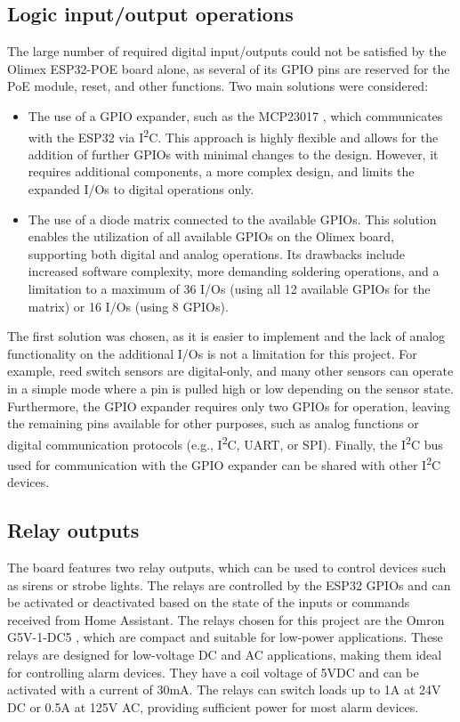 \documentclass[a4paper,12pt]{article}
\begin{document}
\subsection{Logic input/output operations}
The large number of required digital input/outputs could not be satisfied by the Olimex ESP32-POE board alone, as several of its GPIO pins are reserved for the PoE module, reset, and other functions. Two main solutions were considered:
\begin{itemize}
    \item The use of a GPIO expander, such as the MCP23017 \cite{MCP23017}, which communicates with the ESP32 via I\textsuperscript{2}C. This approach is highly flexible and allows for the addition of further GPIOs with minimal changes to the design. However, it requires additional components, a more complex design, and limits the expanded I/Os to digital operations only.
    \item The use of a diode matrix connected to the available GPIOs. This solution enables the utilization of all available GPIOs on the Olimex board, supporting both digital and analog operations. Its drawbacks include increased software complexity, more demanding soldering operations, and a limitation to a maximum of 36 I/Os (using all 12 available GPIOs for the matrix) or 16 I/Os (using 8 GPIOs).
\end{itemize}

The first solution was chosen, as it is easier to implement and the lack of analog functionality on the additional I/Os is not a limitation for this project. For example, reed switch sensors are digital-only, and many other sensors can operate in a simple mode where a pin is pulled high or low depending on the sensor state. Furthermore, the GPIO expander requires only two GPIOs for operation, leaving the remaining pins available for other purposes, such as analog functions or digital communication protocols (e.g., I\textsuperscript{2}C, UART, or SPI). Finally, the I\textsuperscript{2}C bus used for communication with the GPIO expander can be shared with other I\textsuperscript{2}C devices.

\subsection{Relay outputs}
The board features two relay outputs, which can be used to control devices such as sirens or strobe lights. The relays are controlled by the ESP32 GPIOs and can be activated or deactivated based on the state of the inputs or commands received from Home Assistant. The relays chosen for this project are the Omron G5V-1-DC5 \cite{G5V1DC5}, which are compact and suitable for low-power applications.
These relays are designed for low-voltage DC and AC applications, making them ideal for controlling alarm devices. They have a coil voltage of 5VDC and can be activated with a current of 30mA. The relays can switch loads up to 1A at 24V DC or 0.5A at 125V AC, providing sufficient power for most alarm devices.
\end{document}
